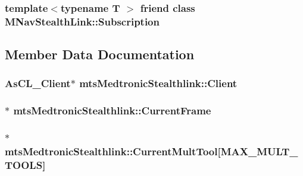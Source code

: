 \subsubsection[{M\+Nav\+Stealth\+Link\+::\+Subscription}]{\setlength{\rightskip}{0pt plus 5cm}template$<$typename T $>$ friend class {\bf M\+Nav\+Stealth\+Link\+::\+Subscription}\hspace{0.3cm}{\ttfamily [friend]}}\label{classmts_medtronic_stealthlink_a4366be00dfae3e97b5db855f73f8e36b}


\subsection{Member Data Documentation}
\hypertarget{classmts_medtronic_stealthlink_a1330ec37490335ecddccec758efd763c}{}
\subsubsection[{Client}]{\setlength{\rightskip}{0pt plus 5cm}As\+C\+L\+\_\+\+Client$\ast$ mts\+Medtronic\+Stealthlink\+::\+Client\hspace{0.3cm}{\ttfamily [protected]}}\label{classmts_medtronic_stealthlink_a1330ec37490335ecddccec758efd763c}
\hypertarget{classmts_medtronic_stealthlink_a49aa0c7078f417253999302e19b67c8d}{}
\subsubsection[{Current\+Frame}]{ $\ast$ mts\+Medtronic\+Stealthlink\+::\+Current\+Frame\hspace{0.3cm}{\ttfamily [protected]}}\label{classmts_medtronic_stealthlink_a49aa0c7078f417253999302e19b67c8d}
\hypertarget{classmts_medtronic_stealthlink_a4e1f3377976ce273c64305dcfdbfe8c4}{}
\subsubsection[{Current\+Mult\+Tool}]{$\ast$ mts\+Medtronic\+Stealthlink\+::\+Current\+Mult\+Tool\mbox{[}{\bf M\+A\+X\+\_\+\+M\+U\+L\+T\+\_\+\+T\+O\+O\+L\+S}\mbox{]}\hspace{0.3cm}{\ttfamily [protected]}}\label{classmts_medtronic_stealthlink_a4e1f3377976ce273c64305dcfdbfe8c4}
\hypertarget{classmts_medtronic_stealthlink_a4411bd7e0677a6acecedd426640ecbc8}{}
